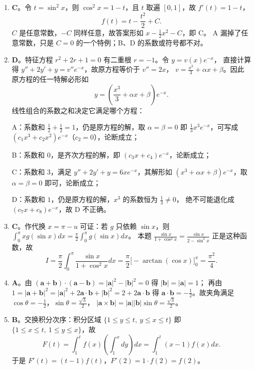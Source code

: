 \begin{enumerate}
{\begin{enumerate}
	\item
	\textbf{C}。令 $t=\sin^2x$，则 $\cos^2x=1-t$，且 $t$ 取遍 $[0,1]$，故 $f'(t)=1-t$，
	\[
	f(t)=t-\frac{t^2}{2}+C .
	\]
	$C$ 是任意常数，$-C$ 同样任意，故答案形如 $x-\frac12x^2-C$，即 C。
	A 漏掉了任意常数，只是 $C=0$ 的一个特例；B、D 的系数或符号都不对。

	\item
	\textbf{D}。特征方程 $r^2+2r+1=0$ 有二重根 $r=-1$。令 $y=v(x)e^{-x}$，
	直接计算得 $y''+2y'+y=v''e^{-x}$，故原方程等价于 $v''=2x$，
	$v=\frac{x^3}{3}+\alpha x+\beta$。因此原方程的任一特解必形如
	\[
	y=\left(\frac{x^3}{3}+\alpha x+\beta\right)e^{-x} .
	\]
	线性组合的系数之和决定它满足哪个方程：

	A：系数和 $\frac12+\frac12=1$，仍是原方程的解，取 $\alpha=\beta=0$ 即
	$\frac13x^3e^{-x}$，可写成 $\left(c_1x^3+c_2x^2\right)e^{-x}$（$c_2=0$），论断成立；

	B：系数和 $0$，是齐次方程的解，即 $\left(c_3x+c_4\right)e^{-x}$，论断成立；

	C：系数和 $3$，满足 $y''+2y'+y=6xe^{-x}$，其解形如
	$\left(x^3+\alpha x+\beta\right)e^{-x}$，取 $\alpha=\beta=0$ 即可，论断成立；

	D：系数和 $1$，仍是原方程的解，$x^3$ 的系数恒为 $\frac13\neq0$，
	绝不可能退化成 $\left(c_7x+c_8\right)e^{-x}$，故 D 不正确。

	\item
	\textbf{C}。作代换 $x=\pi-u$ 可证：若 $g$ 只依赖 $\sin x$，则
	$\int_0^{\pi}xg(\sin x)dx=\frac{\pi}{2}\int_0^{\pi}g(\sin x)dx$。
	本题 $\frac{\sin x}{1+\cos^2x}=\frac{\sin x}{2-\sin^2x}$ 正是这种函数，故
	\[
	I=\frac{\pi}{2}\int_0^{\pi}\frac{\sin x}{1+\cos^2x}dx
	=\frac{\pi}{2}\Big[-\arctan(\cos x)\Big]_0^{\pi}=\frac{\pi^2}{4} .
	\]

	\item
	\textbf{A}。由 $(\bm a+\bm b)\cdot(\bm a-\bm b)=|\bm a|^2-|\bm b|^2=0$ 得 $|\bm b|=|\bm a|=1$；
	再由 $1=|\bm a+\bm b|^2=|\bm a|^2+2\bm a\cdot\bm b+|\bm b|^2=2+2\bm a\cdot\bm b$
	得 $\bm a\cdot\bm b=-\frac12$。故夹角满足 $\cos\theta=-\frac12$，$\sin\theta=\frac{\sqrt3}{2}$，
	$|\bm a\times\bm b|=|\bm a||\bm b|\sin\theta=\frac{\sqrt3}{2}$。

	\item
	\textbf{B}。交换积分次序：积分区域
	$\{1\leqslant y\leqslant t,\ y\leqslant x\leqslant t\}$
	即 $\{1\leqslant x\leqslant t,\ 1\leqslant y\leqslant x\}$，故
	\[
	F(t)=\int_1^{t}f(x)\left(\int_1^{x}dy\right)dx=\int_1^{t}(x-1)f(x)dx .
	\]
	于是 $F'(t)=(t-1)f(t)$，$F'(2)=1\cdot f(2)=f(2)$。


\end{enumerate}}
\end{enumerate}
